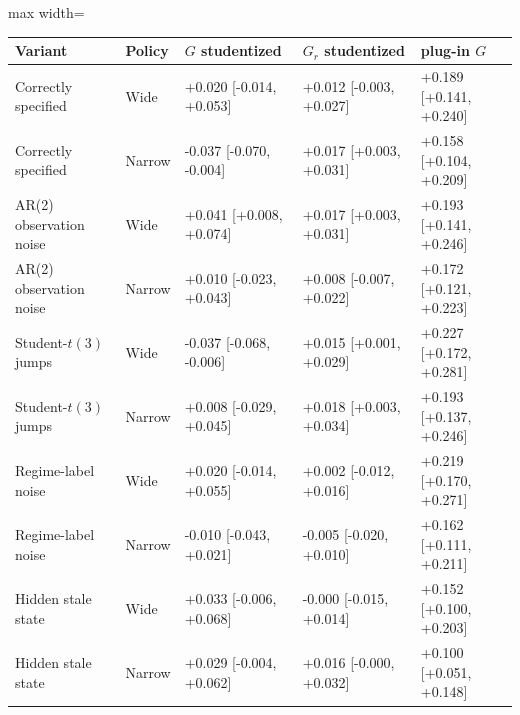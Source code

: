 \begin{table}[!htbp]
\begin{adjustbox}{max width=\linewidth}
\begin{tabular}{@{}lllll@{}}
\toprule
Variant & Policy & $G$ studentized & $G_r$ studentized & plug-in $G$ \\
\midrule
Correctly specified & Wide & +0.020 [-0.014, +0.053] & +0.012 [-0.003, +0.027] & +0.189 [+0.141, +0.240] \\
Correctly specified & Narrow & -0.037 [-0.070, -0.004] & +0.017 [+0.003, +0.031] & +0.158 [+0.104, +0.209] \\
AR(2) observation noise & Wide & +0.041 [+0.008, +0.074] & +0.017 [+0.003, +0.031] & +0.193 [+0.141, +0.246] \\
AR(2) observation noise & Narrow & +0.010 [-0.023, +0.043] & +0.008 [-0.007, +0.022] & +0.172 [+0.121, +0.223] \\
Student-$t(3)$ jumps & Wide & -0.037 [-0.068, -0.006] & +0.015 [+0.001, +0.029] & +0.227 [+0.172, +0.281] \\
Student-$t(3)$ jumps & Narrow & +0.008 [-0.029, +0.045] & +0.018 [+0.003, +0.034] & +0.193 [+0.137, +0.246] \\
Regime-label noise & Wide & +0.020 [-0.014, +0.055] & +0.002 [-0.012, +0.016] & +0.219 [+0.170, +0.271] \\
Regime-label noise & Narrow & -0.010 [-0.043, +0.021] & -0.005 [-0.020, +0.010] & +0.162 [+0.111, +0.211] \\
Hidden stale state & Wide & +0.033 [-0.006, +0.068] & -0.000 [-0.015, +0.014] & +0.152 [+0.100, +0.203] \\
Hidden stale state & Narrow & +0.029 [-0.004, +0.062] & +0.016 [-0.000, +0.032] & +0.100 [+0.051, +0.148] \\
\bottomrule
\end{tabular}
\end{adjustbox}
\vspace{0.5em}

\end{table}
